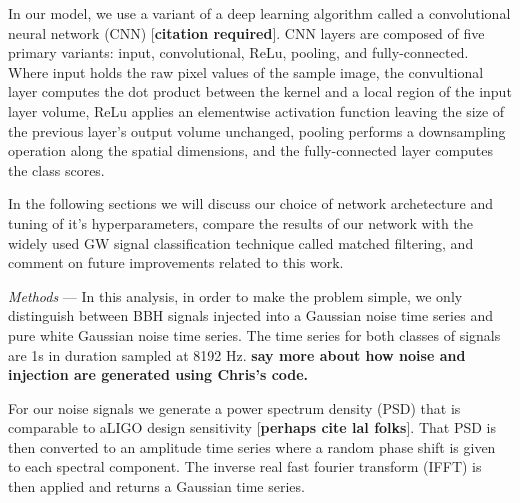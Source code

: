 \documentclass[%
 amsmath,amssymb,
 aps,
 twocolumn,
]{revtex4-1}
\begin{document}
In our model, we use a variant of a deep learning algorithm called a convolutional neural network (CNN) [\textbf{citation required}]. CNN layers are composed of five primary variants: input, convolutional, ReLu, pooling, and fully-connected. Where input holds the raw pixel values of the sample image, the convultional layer computes the dot product between the kernel and a local region of the input layer volume, ReLu applies an elementwise activation function leaving the size of the previous layer's output volume unchanged, pooling performs a downsampling operation along the spatial dimensions, and the fully-connected layer computes the class scores. 

In the following sections we will discuss our choice of network archetecture and tuning of it's hyperparameters, compare the results of our network with the widely used GW signal classification technique called matched filtering, and comment on future improvements related to this work.      

\textit{Methods} --- In this analysis, in order to make the problem simple, we only distinguish between BBH signals injected into a Gaussian noise time series and pure white Gaussian noise time series. The time series for both classes of signals are 1s in duration sampled at 8192 Hz. \textbf{say more about how noise and injection are generated using Chris's code.} 

For our noise signals we generate a power spectrum density (PSD) that is comparable to aLIGO design sensitivity [\textbf{perhaps cite lal folks}]. That PSD is then converted to an amplitude time series where a random phase shift is given to each spectral component. The inverse real fast fourier transform (IFFT) is then applied and returns a Gaussian time series.
\end{document}

